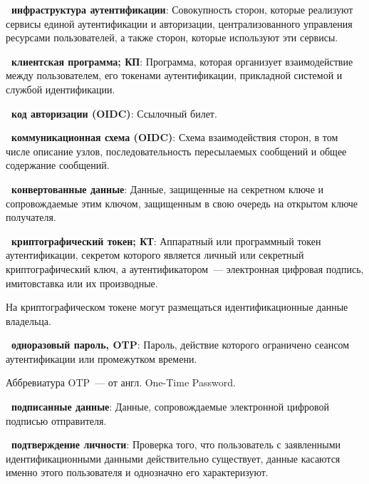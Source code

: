 
{\bf \thedefctr~инфраструктура аутентификации}:
Совокупность сторон, которые реализуют сервисы единой аутентификации и
авторизации, централизованного управления ресурсами пользователей, а также
сторон, которые используют эти сервисы.

{\bf \thedefctr~клиентская программа; КП}:
Программа, которая организует взаимодействие между пользователем, его токенами
аутентификации, прикладной системой и службой идентификации.


{\bf \thedefctr~код авторизации (OIDC)}:
Ссылочный билет.

{\bf \thedefctr~коммуникационная схема (OIDC)}:
Схема взаимодействия сторон, в том числе описание узлов, последовательность
пересылаемых сообщений и общее содержание сообщений.

{\bf \thedefctr~конвертованные данные}: %
Данные, защищенные на секретном ключе и сопровождаемые этим ключом, защищенным в
свою очередь на открытом ключе получателя.

{\bf \thedefctr~криптографический токен; КТ}:
Аппаратный или программный токен аутентификации, секретом которого является
личный или секретный криптографический ключ, а аутентификатором~---  электронная
цифровая подпись, имитовставка или их производные.

\begin{note*}
На криптографическом токене могут размещаться идентификационные данные 
владельца.
\end{note*}

{\bf \thedefctr~одноразовый пароль, OTP}: %
Пароль, действие которого ограничено сеансом аутентификации или промежутком 
времени.

\begin{note*}
Аббревиатура OTP~--- от англ. One-Time Password.
\end{note*}

{\bf \thedefctr~подписанные данные}: %
Данные, сопровождаемые электронной цифровой подписью отправителя. 

{\bf \thedefctr~подтверждение личности}:
Проверка того, что пользователь с заявленными идентификационными данными
действительно существует, данные касаются именно этого пользователя и однозначно
его характеризуют.


